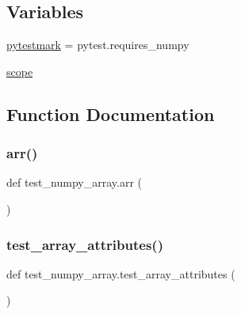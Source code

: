\subsection*{Variables}
\begin{DoxyCompactItemize}
\item 
\mbox{\hyperlink{namespacetest__numpy__array_a0f741fb6c62f9c42ecb2d8a54da7f27b}{pytestmark}} = pytest.\+requires\+\_\+numpy
\item 
\mbox{\hyperlink{namespacetest__numpy__array_aa4b6292fe8f749e6fd777bdd55de22e6}{scope}}
\end{DoxyCompactItemize}


\subsection{Function Documentation}
\mbox{\label{namespacetest__numpy__array_af2b383eea3b9845ac8f4f4cf9c40fd6a}} 
\subsubsection{\texorpdfstring{arr()}{arr()}}
{\footnotesize\ttfamily def test\+\_\+numpy\+\_\+array.\+arr (\begin{DoxyParamCaption}{ }\end{DoxyParamCaption})}

\mbox{\label{namespacetest__numpy__array_a5bdeafb8ef0da5be993ed8517f8a7c2a}} 
\subsubsection{\texorpdfstring{test\_array\_attributes()}{test\_array\_attributes()}}
{\footnotesize\ttfamily def test\+\_\+numpy\+\_\+array.\+test\+\_\+array\+\_\+attributes (\begin{DoxyParamCaption}{ }\end{DoxyParamCaption})}

\mbox{\label{namespacetest__numpy__array_a66b347b2471489acdd3585b3bc8a0314}} 
